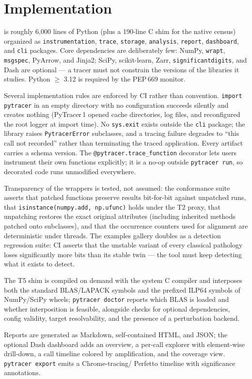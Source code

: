 \section{Implementation}
\label{sec:implementation}

\pyt{} is roughly 6{,}000 lines of Python (plus a 190-line C shim for the
native census) organized as \texttt{instrumentation}, \texttt{trace},
\texttt{storage}, \texttt{analysis}, \texttt{report}, \texttt{dashboard},
and \texttt{cli} packages. Core dependencies are deliberately few: NumPy,
\texttt{wrapt}, \texttt{msgspec}, PyArrow, and Jinja2; SciPy,
scikit-learn, Zarr, \texttt{significantdigits}, and Dash are optional ---
a tracer must not constrain the versions of the libraries it studies.
Python $\geq$ 3.12 is required by the PEP\,669 monitor.

Several implementation rules are enforced by CI rather than convention.
\texttt{import pytracer} in an empty directory with no configuration
succeeds silently and creates nothing (PyTracer\,1 opened cache
directories, log files, and reconfigured the root logger at import time).
No \texttt{sys.exit} exists outside the \texttt{cli} package; the library
raises \texttt{PytracerError} subclasses, and a tracing failure degrades
to ``this call not recorded'' rather than terminating the traced
application. Every artifact carries a schema version. The
\texttt{@pytracer.trace\_function} decorator lets users instrument their
own functions explicitly; it is a no-op outside \texttt{pytracer run}, so
decorated code runs unmodified everywhere.

Transparency of the wrappers is tested, not assumed: the conformance
suite asserts that patched functions preserve results bit-for-bit against
unpatched runs, that \texttt{isinstance(numpy.add, np.ufunc)} holds under
the T2 proxy, that unpatching restores the exact original attributes
(including inherited methods patched onto subclasses), and that the
occurrence counters used for alignment are deterministic under threads.
The examples gallery doubles as a detection regression suite: CI asserts
that the unstable variant of every classical pathology loses
significantly more bits than its stable twin --- the tool must keep
detecting what it exists to detect.

The T5 shim is compiled on demand with the system C compiler and
interposes both the standard BLAS/LAPACK symbols and the prefixed ILP64
symbols of NumPy/SciPy wheels; \texttt{pytracer doctor} reports which
BLAS is loaded and whether interposition is feasible, alongside checks
for optional dependencies, config validity, target resolvability, and the
presence of a perturbation backend.

Reports are generated as Markdown, self-contained HTML, and JSON; the
optional Dash dashboard adds an overview, a per-call explorer with
element-wise drill-down, a call timeline colored by amplification, and
the coverage view. \texttt{pytracer export} emits a Chrome-tracing/%
Perfetto timeline with significance annotations.
